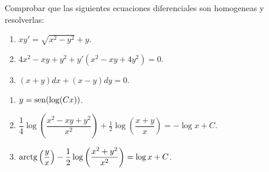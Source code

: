 
{Comprobar que las siguientes ecuaciones diferenciales son homogeneas y resolverlas:
\begin{enumerate}
\item $xy'=\sqrt{x^2-y^2}+y$.
\item $4x^2−xy+y^2+y'(x^2−xy+4y^2)=0$.
\item $(x+y)dx + (x-y)dy = 0$.
\end{enumerate}
}
{
\begin{enumerate}
\item $y=\operatorname{sen}(\log(Cx))$.
\item $\dfrac{1}{4}\log\left(\dfrac{x^2-xy+y^2}{x^2}\right)+\frac{1}{2}\log\left(\dfrac{x+y}{x}\right)=-\log x +C$.
\item $\operatorname{arctg}\left(\dfrac{y}{x}\right)-\dfrac{1}{2}\log\left(\dfrac{x^2+y^2}{x^2}\right)=\log x + C$. 
\end{enumerate}
}
{}
